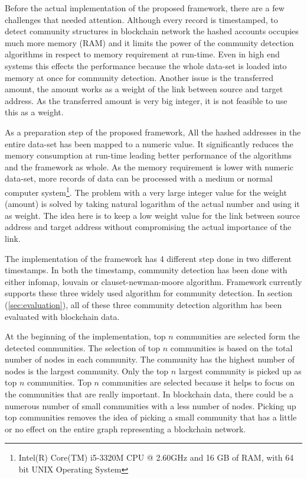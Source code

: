 Before the actual implementation of the proposed framework, there are a few challenges that needed attention. Although every record is timestamped, to detect community structures in blockchain network the hashed accounts occupies much more memory (RAM) and it limits the power of the community detection algorithms in respect to memory requirement at run-time. Even in high end systems this effects the performance because the whole data-set is loaded into memory at once for community detection. Another issue is the transferred amount, the amount works as a weight of the link between source and target address. As the transferred amount is very big integer, it is not feasible to use this as a weight. 

As a preparation step of the proposed framework, All the hashed addresses in the entire data-set has been mapped to a numeric value. It significantly reduces the memory consumption at run-time leading better performance of the algorithms and the framework as whole. As the memory requirement is lower with numeric data-set, more records of data can be processed with a medium or normal computer system\footnote{Intel(R) Core(TM) i5-3320M CPU @ 2.60GHz and 16 GB of RAM, with 64 bit UNIX Operating System}.  The problem with a very large integer value for the weight (amount) is solved by taking natural logarithm of the actual number and using it as weight. The idea here is to keep a low weight value for the link between source address and target address without compromising the actual importance of the link.

The implementation of the framework has 4 different step done in two different timestamps. In both the timestamp, community detection has been done with either infomap, louvain or clauset-newman-moore algorithm. Framework currently supports these three widely used algorithm for community detection. In section (\ref{sec:evaluation}), all of these three community detection algorithm has been evaluated with blockchain data.

At the beginning of the implementation, top $n$ communities are selected form the detected communities. The selection of top $n$ communities is based on the total number of nodes in each community. The community has the highest number of nodes is the largest community. Only the top $n$ largest community is picked up as top $n$ communities. Top $n$ communities are selected because it helps to focus on the communities that are really important. In blockchain data, there could be a numerous number of small communities with a less number of nodes. Picking up top communities removes the idea of picking a small community that has a little or no effect on the entire graph representing a blockchain network.

